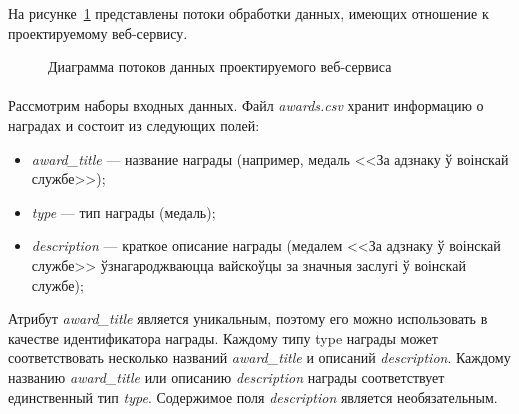 На рисунке~\ref{fig:activity_diagram} представлены потоки обработки данных,
имеющих отношение к проектируемому веб-сервису.

\begin{figure}[h!]
  \centering
  \small{
    
  }
  \caption{Диаграмма потоков данных проектируемого веб-сервиса}
  \label{fig:activity_diagram}
\end{figure}

\paragraph{}
Рассмотрим наборы входных данных.
Файл \textit{awards.csv} хранит информацию о наградах и состоит из
следующих полей:
\begin{itemize}
\item
  \textit{award\_title} --- название награды
  (например, медаль <<За адзнаку ў воінскай службе>>);
\item
  \textit{type} --- тип награды
  (медаль);
\item
  \textit{description} --- краткое описание награды
  (медалем <<За адзнаку ў воінскай службе>>
  ўзнагароджваюцца вайскоўцы за значныя заслугі ў воінскай службе);
\end{itemize}

Атрибут \textit{award\_title} является уникальным, поэтому его можно использовать
в качестве идентификатора награды.
Каждому типу type награды может соответствовать несколько названий 
\textit{award\_title} и описаний \textit{description}.
Каждому названию \textit{award\_title} или описанию \textit{description} награды
соответствует единственный тип \textit{type}.
Содержимое поля \textit{description} является необязательным.

